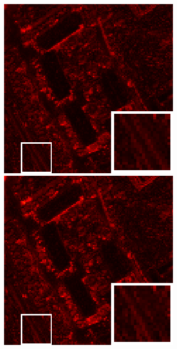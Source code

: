 \begin{figure}[t]
\begin{center}
\begin{minipage}{0.15\hsize}
		\end{minipage}
		\begin{minipage}{0.15\hsize}
			\centerline{\includegraphics[width=\hsize]{./fig_supplement/SAM_map_color_woboundary/PaviaU120/sam_map_HSSTV_L12.eps}} %
		\end{minipage}
		\begin{minipage}{0.15\hsize}
			\centerline{\includegraphics[width=\hsize]{./fig_supplement/SAM_map_color_woboundary/PaviaU120/sam_map_l0l1HTV.eps}} %

\end{minipage}
\end{center}
\end{figure}
